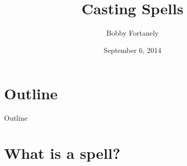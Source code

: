 \documentclass[utf8x]{beamer}
\begin{document}
  
\title{Casting Spells}
\date{September 6, 2014}
\author{Bobby Fortanely}

\begin{frame}
  \titlepage
\end{frame}
  
\section*{Outline}
  \begin{frame}{Outline}
    \tableofcontents
  \end{frame}
\section{What is a spell?}
  \subsection*{}
  
\end{document}
